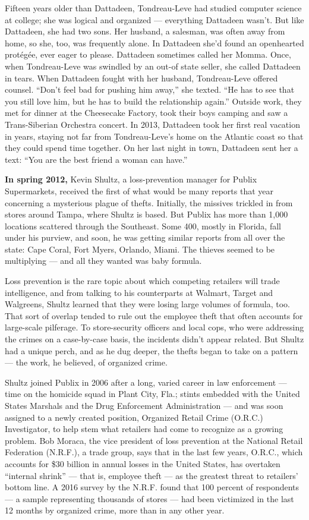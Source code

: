Fifteen years older than Dattadeen, Tondreau-Leve had studied computer
science at college; she was logical and organized --- everything
Dattadeen wasn't. But like Dattadeen, she had two sons. Her husband, a
salesman, was often away from home, so she, too, was frequently alone.
In Dattadeen she'd found an openhearted protégée, ever eager to please.
Dattadeen sometimes called her Momma. Once, when Tondreau-Leve was
swindled by an out-of state seller, she called Dattadeen in tears. When
Dattadeen fought with her husband, Tondreau-Leve offered counsel.
``Don't feel bad for pushing him away,'' she texted. ``He has to see
that you still love him, but he has to build the relationship again.''
Outside work, they met for dinner at the Cheesecake Factory, took their
boys camping and saw a Trans-Siberian Orchestra concert. In 2013,
Dattadeen took her first real vacation in years, staying not far from
Tondreau-Leve's home on the Atlantic coast so that they could spend time
together. On her last night in town, Dattadeen sent her a text: ``You
are the best friend a woman can have.''

\textbf{In spring 2012,} Kevin Shultz, a loss-prevention manager for
Publix Supermarkets, received the first of what would be many reports
that year concerning a mysterious plague of thefts. Initially, the
missives trickled in from stores around Tampa, where Shultz is based.
But Publix has more than 1,000 locations scattered through the
Southeast. Some 400, mostly in Florida, fall under his purview, and
soon, he was getting similar reports from all over the state: Cape
Coral, Fort Myers, Orlando, Miami. The thieves seemed to be multiplying
--- and all they wanted was baby formula.

Loss prevention is the rare topic about which competing retailers will
trade intelligence, and from talking to his counterparts at Walmart,
Target and Walgreens, Shultz learned that they were losing large volumes
of formula, too. That sort of overlap tended to rule out the employee
theft that often accounts for large-scale pilferage. To store-security
officers and local cops, who were addressing the crimes on a
case-by-case basis, the incidents didn't appear related. But Shultz had
a unique perch, and as he dug deeper, the thefts began to take on a
pattern --- the work, he believed, of organized crime.

Shultz joined Publix in 2006 after a long, varied career in law
enforcement --- time on the homicide squad in Plant City, Fla.; stints
embedded with the United States Marshals and the Drug Enforcement
Administration --- and was soon assigned to a newly created position,
Organized Retail Crime (O.R.C.) Investigator, to help stem what
retailers had come to recognize as a growing problem. Bob Moraca, the
vice president of loss prevention at the National Retail Federation
(N.R.F.), a trade group, says that in the last few years, O.R.C., which
accounts for \$30 billion in annual losses in the United States, has
overtaken ``internal shrink'' --- that is, employee theft --- as the
greatest threat to retailers' bottom line. A 2016 survey by the N.R.F.
found that 100 percent of respondents --- a sample representing
thousands of stores --- had been victimized in the last 12 months by
organized crime, more than in any other year.

